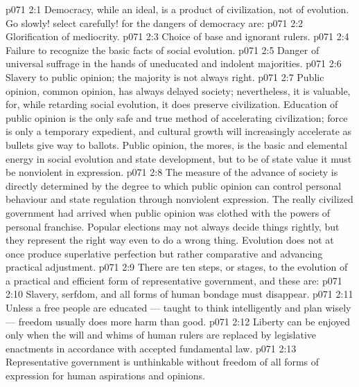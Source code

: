 \vs p071 2:1 Democracy, while an ideal, is a product of civilization, not of evolution. Go slowly! select carefully! for the dangers of democracy are:
\vs p071 2:2 \bibnobreakspace Glorification of mediocrity.
\vs p071 2:3 \bibnobreakspace Choice of base and ignorant rulers.
\vs p071 2:4 \bibnobreakspace Failure to recognize the basic facts of social evolution.
\vs p071 2:5 \bibnobreakspace Danger of universal suffrage in the hands of uneducated and indolent majorities.
\vs p071 2:6 \bibnobreakspace Slavery to public opinion; the majority is not always right.
\vs p071 2:7 \pc Public opinion, common opinion, has always delayed society; nevertheless, it is valuable, for, while retarding social evolution, it does preserve civilization. Education of public opinion is the only safe and true method of accelerating civilization; force is only a temporary expedient, and cultural growth will increasingly accelerate as bullets give way to ballots. Public opinion, the mores, is the basic and elemental energy in social evolution and state development, but to be of state value it must be nonviolent in expression.
\vs p071 2:8 The measure of the advance of society is directly determined by the degree to which public opinion can control personal behaviour and state regulation through nonviolent expression. The really civilized government had arrived when public opinion was clothed with the powers of personal franchise. Popular elections may not always decide things rightly, but they represent the right way even to do a wrong thing. Evolution does not at once produce superlative perfection but rather comparative and advancing practical adjustment.
\vs p071 2:9 \pc There are ten steps, or stages, to the evolution of a practical and efficient form of representative government, and these are:
\vs p071 2:10 \bibnobreakspace {} Slavery, serfdom, and all forms of human bondage must disappear.
\vs p071 2:11 \bibnobreakspace {} Unless a free people are educated --- taught to think intelligently and plan wisely --- freedom usually does more harm than good.
\vs p071 2:12 \bibnobreakspace {} Liberty can be enjoyed only when the will and whims of human rulers are replaced by legislative enactments in accordance with accepted fundamental law.
\vs p071 2:13 \bibnobreakspace {} Representative government is unthinkable without freedom of all forms of expression for human aspirations and opinions.

